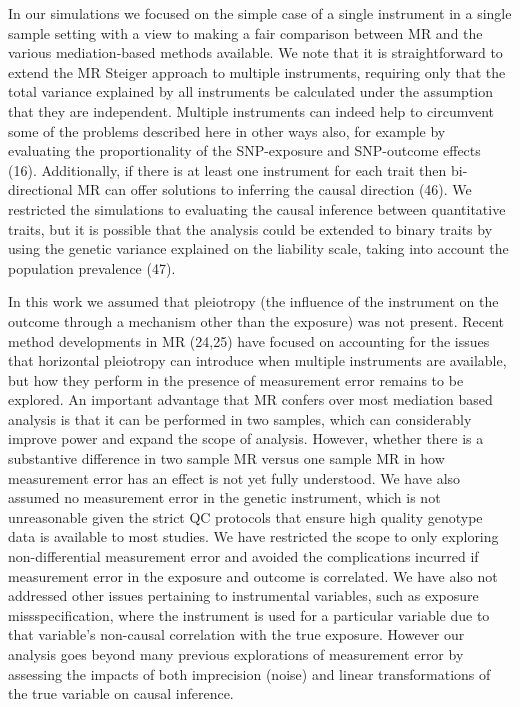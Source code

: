 \documentclass[]{article}
\begin{document}
In our simulations we focused on the simple case of a single instrument
in a single sample setting with a view to making a fair comparison
between MR and the various mediation-based methods available. We note
that it is straightforward to extend the MR Steiger approach to multiple
instruments, requiring only that the total variance explained by all
instruments be calculated under the assumption that they are
independent. Multiple instruments can indeed help to circumvent some of
the problems described here in other ways also, for example by
evaluating the proportionality of the SNP-exposure and SNP-outcome
effects (16). Additionally, if there is at least one instrument for each
trait then bi-directional MR can offer solutions to inferring the causal
direction (46). We restricted the simulations to evaluating the causal
inference between quantitative traits, but it is possible that the
analysis could be extended to binary traits by using the genetic
variance explained on the liability scale, taking into account the
population prevalence (47).

In this work we assumed that pleiotropy (the influence of the instrument
on the outcome through a mechanism other than the exposure) was not
present. Recent method developments in MR (24,25) have focused on
accounting for the issues that horizontal pleiotropy can introduce when
multiple instruments are available, but how they perform in the presence
of measurement error remains to be explored. An important advantage that
MR confers over most mediation based analysis is that it can be
performed in two samples, which can considerably improve power and
expand the scope of analysis. However, whether there is a substantive
difference in two sample MR versus one sample MR in how measurement
error has an effect is not yet fully understood. We have also assumed no
measurement error in the genetic instrument, which is not unreasonable
given the strict QC protocols that ensure high quality genotype data is
available to most studies. We have restricted the scope to only
exploring non-differential measurement error and avoided the
complications incurred if measurement error in the exposure and outcome
is correlated. We have also not addressed other issues pertaining to
instrumental variables, such as exposure missspecification, where the
instrument is used for a particular variable due to that variable's
non-causal correlation with the true exposure. However our analysis goes
beyond many previous explorations of measurement error by assessing the
impacts of both imprecision (noise) and linear transformations of the
true variable on causal inference.
\end{document}

